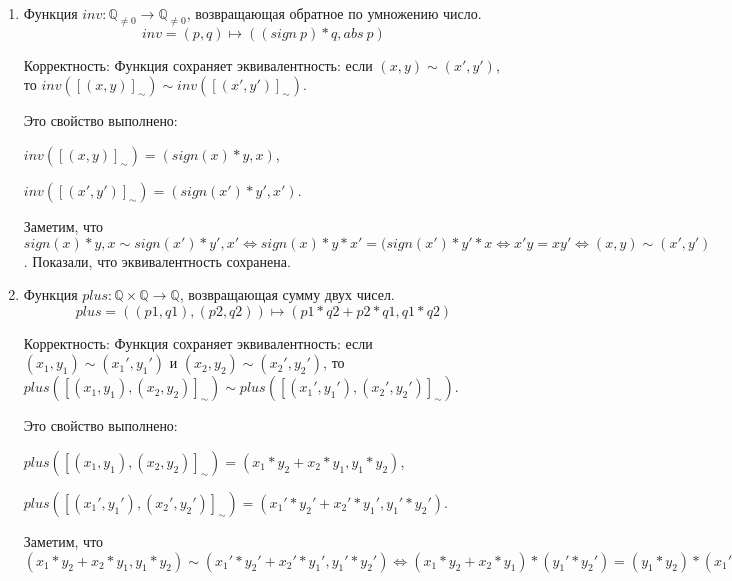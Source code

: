 \begin{enumerate}
\begin{enumerate}
Корректность: Функция сохраняет эквивалентность: если $(x,y) \sim (x',y')$, то $neg([(x,y)]_\sim) 
\sim neg([(x',y')]_\sim)$. 

Это свойство выполнено: 

$neg([(x,y)]_\sim) = (-x, y)$, 

$neg([(x',y')]_\sim) = (-x', y')$. 

Заметим, что $(-x, y) \sim (-x', y') \Leftrightarrow -xy' = -x'y 
\Leftrightarrow xy' = x'y \Leftrightarrow (x,y) \sim (x',y')$. Показали, что эквивалентность 
сохранена.

\item Функция $inv : \mathbb{Q}_{\neq 0} \to \mathbb{Q}_{\neq 0}$, возвращающая обратное по умножению число.
\begin{equation*}
	inv = (p, q) \mapsto ((sign \ p) * q, abs \ p)
\end{equation*}

Корректность: Функция сохраняет эквивалентность: если $(x,y) \sim (x',y')$, то $inv([(x,y)]_\sim) 
\sim inv([(x',y')]_\sim)$. 

Это свойство выполнено: 

$inv([(x,y)]_\sim) = (sign(x) *y, x)$, 

$inv([(x',y')]_\sim) = (sign(x') * y', x')$. 

Заметим, что $sign(x) *y, x \sim sign(x') * y', x' 
\Leftrightarrow sign(x) * y * x' = (sign(x') * y' * x \Leftrightarrow x'y = xy' \Leftrightarrow (x,y) 
\sim (x',y')$. Показали, что эквивалентность сохранена.

\item Функция $plus : \mathbb{Q} \times \mathbb{Q} \to \mathbb{Q}$, возвращающая сумму двух чисел.
\begin{equation*}
	plus = ((p1, q1),  (p2, q2)) \mapsto (p1 * q2 + p2 * q1, q1 * q2)
\end{equation*}

Корректность: Функция сохраняет эквивалентность: если $(x_1,y_1) \sim (x_1',y_1')$ и $(x_2,y_2) \sim (x_2',y_2')$, то $plus([(x_1,y_1), (x_2, y_2)]_\sim) 
\sim plus([(x_1',y_1'), (x_2', y_2')]_\sim)$. 

Это свойство выполнено:

 $plus([(x_1,y_1), (x_2, y_2)]_\sim)     = (x_1 * y_2 + x_2 * y_1, y_1 * y_2)$,
 
 $plus([(x_1',y_1'), (x_2', y_2')]_\sim) = (x_1' * y_2' + x_2' * y_1', y_1' * y_2')$. 
 
 Заметим, что $(x_1 * y_2 + x_2 * y_1, y_1 * y_2) \sim (x_1' * y_2' + x_2' * y_1', y_1' * y_2') 
\Leftrightarrow (x_1 * y_2 + x_2 * y_1) * (y_1' * y_2') = (y_1 * y_2) * (x_1' * y_2' + x_2' * y_1') \Leftrightarrow x_1  y_2  y_1'  y_2' + x_2  y_1  y_1'  y_2' 
              = x_1'  y_2'  y_1  y_2 + x_2'  y_1'  y_1  y_2$
 

\end{enumerate}
\end{enumerate}
